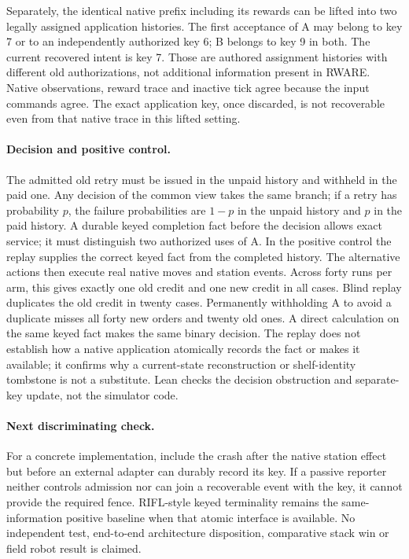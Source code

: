 \documentclass{article}
\begin{document}
Separately, the identical native prefix including its rewards can be
lifted into two legally assigned application histories. The first
acceptance of A may belong to key 7 or to an independently authorized
key 6; B belongs to key 9 in both. The current recovered intent is
key 7. Those are authored assignment histories with different old
authorizations, not additional information present in RWARE. Native
observations, reward trace and inactive tick agree because the input
commands agree. The exact application key, once discarded, is not
recoverable even from that native trace in this lifted setting.

\paragraph{Decision and positive control.}
The admitted old retry must be issued in the unpaid history and withheld
in the paid one. Any decision of the common view takes the same branch;
if a retry has probability $p$, the failure probabilities are $1-p$
in the unpaid history and $p$ in the paid history. A durable keyed
completion fact before the decision allows exact service; it must
distinguish two authorized uses of A. In the positive control the replay
supplies the correct keyed fact from the completed history. The
alternative actions then execute real native moves and station events.
Across forty runs per arm, this gives exactly one old credit and one
new credit in all cases. Blind replay duplicates the old credit in
twenty cases. Permanently withholding A to avoid a duplicate misses all
forty new orders and twenty old ones. A direct calculation on the
same keyed fact makes the same binary decision. The replay does not
establish how a native application atomically records the fact or
makes it available; it confirms why a current-state reconstruction or
shelf-identity tombstone is not a substitute. Lean checks the decision
obstruction and separate-key update, not the simulator code.

\paragraph{Next discriminating check.}
For a concrete implementation, include the crash after the native station
effect but before an external adapter can durably record its key.
If a passive reporter neither controls admission nor can join a
recoverable event with the key, it cannot provide the required fence.
RIFL-style keyed terminality remains the same-information positive
baseline when that atomic interface is available. No independent test,
end-to-end architecture disposition, comparative stack win or field
robot result is claimed.
\end{document}
